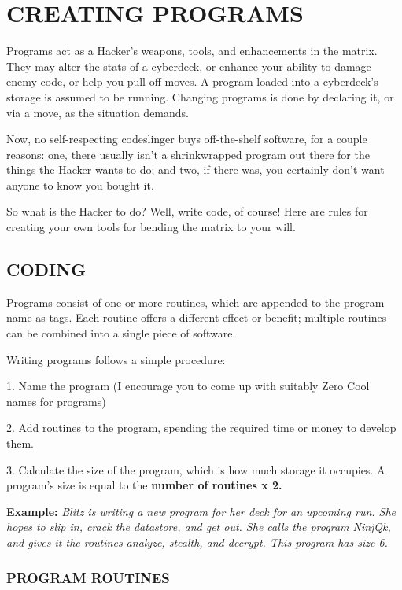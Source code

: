 \documentclass[oneside,10pt]{article}
\begin{document}
\section{CREATING PROGRAMS}
\begin{multicols}{2}
Programs act as a Hacker’s weapons, tools, and enhancements in the matrix. They may alter the stats of a cyberdeck,
or enhance your ability to damage enemy code, or help you
pull off moves. A program loaded into a cyberdeck’s storage
is assumed to be running. Changing programs is done by declaring it, or via a move, as the situation demands.

Now, no self-respecting codeslinger buys off-the-shelf software, for a couple reasons: one, there usually isn’t a shrinkwrapped program out there for the things the Hacker wants
to do; and two, if there was, you certainly don’t want anyone
to know you bought it.

So what is the Hacker to do? Well, write code, of course!
Here are rules for creating your own tools for bending the
matrix to your will.

\subsection{CODING}
Programs consist of one or more routines, which are appended to the program name as tags. Each routine offers a different effect or benefit; multiple routines can be combined into
a single piece of software.

Writing programs follows a simple procedure:
\begin{adjustwidth*}{.5cm}{.5cm}

1.	Name the program (I encourage you to come up with
suitably Zero Cool names for programs)

2.	Add routines to the program, spending the required
time or money to develop them.

3.	Calculate the size of the program, which is how much
storage it occupies. A program’s size is equal to the
\textbf{number of routines x 2.}

\textbf{Example:} \textit{Blitz is writing a new program for her deck for
an upcoming run. She hopes to slip in, crack the datastore,
and get out. She calls the program NinjQk, and gives it
the routines analyze, stealth, and decrypt. This program
has size 6.}
\end{adjustwidth*}
\subsubsection{PROGRAM ROUTINES}


\end{multicols}
\end{document}
